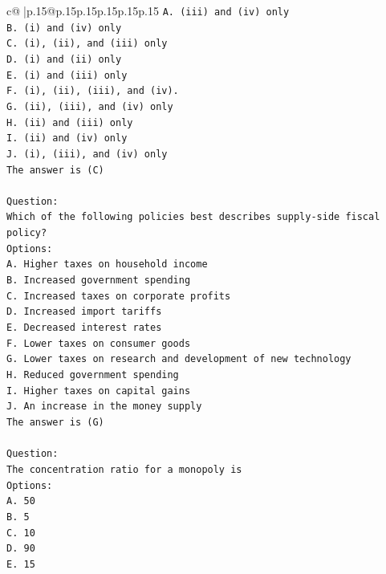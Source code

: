 \documentclass{article}
\begin{document}
{\begin{supertabular}{c@{$\;$}|p{.15\linewidth}@{}p{.15\linewidth}p{.15\linewidth}p{.15\linewidth}p{.15\linewidth}p{.15\linewidth}}
{{{\texttt{A. (iii) and (iv) only} \\
\texttt{B. (i) and (iv) only} \\
\texttt{C. (i), (ii), and (iii) only} \\
\texttt{D. (i) and (ii) only} \\
\texttt{E. (i) and (iii) only} \\
\texttt{F. (i), (ii), (iii), and (iv).} \\
\texttt{G. (ii), (iii), and (iv) only} \\
\texttt{H. (ii) and (iii) only} \\
\texttt{I. (ii) and (iv) only} \\
\texttt{J. (i), (iii), and (iv) only} \\
\texttt{The answer is (C)} \\
\\ 
\texttt{Question:} \\
\texttt{Which of the following policies best describes supply{-}side fiscal policy?} \\
\texttt{Options:} \\
\texttt{A. Higher taxes on household income} \\
\texttt{B. Increased government spending} \\
\texttt{C. Increased taxes on corporate profits} \\
\texttt{D. Increased import tariffs} \\
\texttt{E. Decreased interest rates} \\
\texttt{F. Lower taxes on consumer goods} \\
\texttt{G. Lower taxes on research and development of new technology} \\
\texttt{H. Reduced government spending} \\
\texttt{I. Higher taxes on capital gains} \\
\texttt{J. An increase in the money supply} \\
\texttt{The answer is (G)} \\
\\ 
\texttt{Question:} \\
\texttt{The concentration ratio for a monopoly is} \\
\texttt{Options:} \\
\texttt{A. 50} \\
\texttt{B. 5} \\
\texttt{C. 10} \\
\texttt{D. 90} \\
\texttt{E. 15} \\
}}}
\end{supertabular}}
\end{document}
